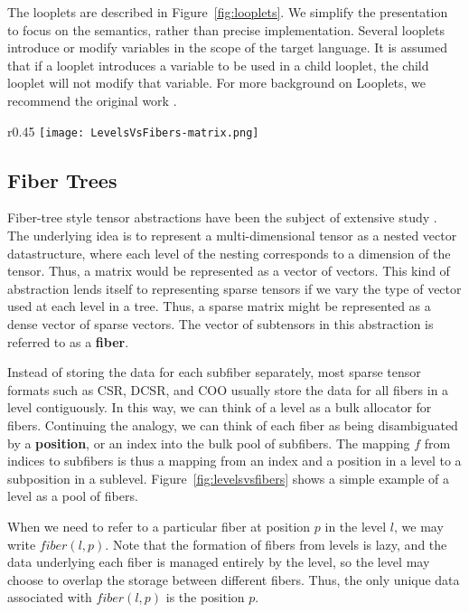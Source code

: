 The looplets are described in Figure~\ref{fig:looplets}. We simplify the presentation to focus on the semantics, rather than precise implementation. Several looplets introduce or modify variables in the scope of the target language. It is assumed that if a looplet introduces a variable to be used in a child looplet, the child looplet will not modify that variable. For more background on Looplets, we recommend the original work \cite{ahrens_looplets_2023}. 

\begin{wrapfigure}{r}{0.45\linewidth}
    \centering
    \vspace{-28pt}
    \texttt{[image: LevelsVsFibers-matrix.png]}
    \vspace{-16pt}
    \caption{Levels in the fiber tree representation of a sparse matrix in CSC format, with a dense outer level and a sparse inner level. The element level holds the leaves of the tree.}
    \label{fig:levelsvsfibers}
    \vspace{-24pt}
\end{wrapfigure}
\subsection{Fiber Trees}

Fiber-tree style tensor abstractions have been the subject of extensive study
\cite{sze2017efficient, chou2022compilation, chou2018format}.  The underlying
idea is to represent a multi-dimensional tensor as a nested vector
datastructure, where each level of the nesting corresponds to a dimension of the
tensor. Thus, a matrix would be represented as a vector of vectors. This kind of
abstraction lends itself to representing sparse tensors if we vary the type of
vector used at each level in a tree. Thus, a sparse matrix might be represented
as a dense vector of sparse vectors. The vector of subtensors in this
abstraction is referred to as a \textbf{fiber}.

Instead of storing the data for each subfiber separately, most sparse tensor
formats such as CSR, DCSR, and COO usually store the data for all fibers in a
level contiguously. In this way, we can think of a level as a bulk allocator for
fibers. Continuing the analogy, we can think of each fiber as being
disambiguated by a \textbf{position}, or an index into the bulk pool of
subfibers. The mapping $f$ from indices to subfibers is thus a mapping from an
index and a position in a level to a subposition in a sublevel.
Figure~\ref{fig:levelsvsfibers} shows a simple example of a level as a pool of fibers.

When we need to refer to a particular fiber at position $p$ in the level $l$, we
may write $fiber(l, p)$. Note that the formation of fibers from levels is lazy,
and the data underlying each fiber is managed entirely by the level, so the
level may choose to overlap the storage between different fibers. Thus, the only
unique data associated with $fiber(l, p)$ is the position $p$.